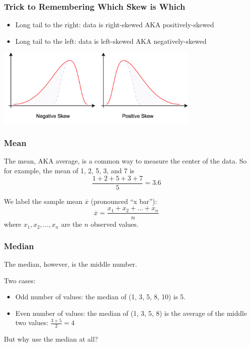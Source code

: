 \documentclass[handout]{beamer}
\newcommand{\blue}[1]{\textcolor{blue2}{#1}}
\begin{document}
\begin{frame}[fragile]
\frametitle{Trick to Remembering Which Skew is Which}

\begin{itemize}
\pause\item Long tail to the right: data is \blue{right-skewed} AKA \blue{positively-skewed}
\pause\item Long tail to the left: data is \blue{left-skewed} AKA \blue{negatively-skewed}
\end{itemize}

\begin{center}
\pause\includegraphics[width=10cm]{figure/skew.png}
\end{center}


\end{frame}


\begin{frame}[fragile]
\frametitle{Mean}
The mean, AKA average, is a common way to measure the \blue{center} of the data.  So for example, the mean of 1, 2, 5, 3, and 7 is 
\[\frac{1 + 2 + 5 + 3 + 7}{5} = 3.6\]

\pause We label the \blue{sample mean} $\overline{x}$ (pronounced ``x bar''):
\[
\overline{x} = \frac{x_1 + x_2 + \ldots + x_n}{n}
\]
where $x_1, x_2, \ldots, x_n$ are the $n$ observed values.  
\end{frame}


\begin{frame}[fragile]
\frametitle{Median}
The \blue{median}, however, is the \blue{middle number}.

\vspace{0.5cm}

\pause Two cases:
\begin{itemize}
\item Odd number of values: the median of (1, 3, \blue{5}, 8, 10) is 5.
\item Even number of values: the median of (1, \blue{3, 5}, 8) is the average of the middle two values: $\frac{3+5}{2} = 4$
\end{itemize}

\vspace{0.5cm}

\pause But why use the median at all?

\end{frame}
\end{document}
